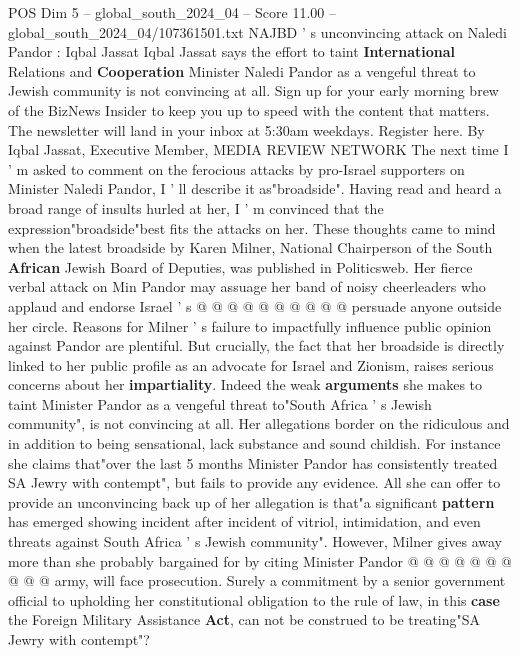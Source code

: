 \begin{textsample}{POS Dim 5 – global\_south\_2024\_04 – Score 11.00 – global\_south\_2024\_04/107361501.txt}  \label{ex:f5_pos_336}
NAJBD ' s unconvincing attack on Naledi Pandor : Iqbal Jassat Iqbal Jassat says the effort to taint \textbf{International} Relations and \textbf{Cooperation} Minister Naledi Pandor as a vengeful threat to Jewish community is not convincing at all.
Sign up for your early morning brew of the BizNews Insider to keep you up to speed with the content that matters.
The newsletter will land in your inbox at 5:30am weekdays.
Register here.
By Iqbal Jassat, Executive Member, MEDIA REVIEW NETWORK The next time I ' m asked to comment on the ferocious attacks by pro-Israel supporters on Minister Naledi Pandor, I ' ll describe it as"broadside".
Having read and heard a broad range of insults hurled at her, I ' m convinced that the expression"broadside"best fits the attacks on her.
These thoughts came to mind when the latest broadside by Karen Milner, National Chairperson of the South \textbf{African} Jewish Board of Deputies, was published in Politicsweb.
Her fierce verbal attack on Min Pandor may assuage her band of noisy cheerleaders who applaud and endorse Israel ' s @ @ @ @ @ @ @ @ @ @ persuade anyone outside her circle.
Reasons for Milner ' s failure to impactfully influence public opinion against Pandor are plentiful.
But crucially, the fact that her broadside is directly linked to her public profile as an advocate for Israel and Zionism, raises serious concerns about her \textbf{impartiality}.
Indeed the weak \textbf{arguments} she makes to taint Minister Pandor as a vengeful threat to"South Africa ' s Jewish community", is not convincing at all.
Her allegations border on the ridiculous and in addition to being sensational, lack substance and sound childish.
For instance she claims that"over the last 5 months Minister Pandor has consistently treated SA Jewry with contempt", but fails to provide any evidence.
All she can offer to provide an unconvincing back up of her allegation is that"a significant \textbf{pattern} has emerged showing incident after incident of vitriol, intimidation, and even threats against South Africa ' s Jewish community".
However, Milner gives away more than she probably bargained for by citing Minister Pandor @ @ @ @ @ @ @ @ @ @ army, will face prosecution.
Surely a commitment by a senior government official to upholding her constitutional obligation to the rule of law, in this \textbf{case} the Foreign Military Assistance \textbf{Act}, can not be construed to be treating"SA Jewry with contempt"?

\end{textsample}
